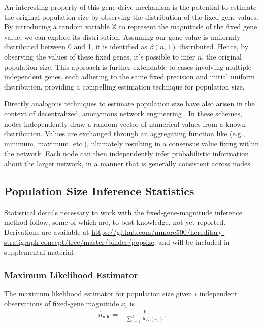 An interesting property of this gene drive mechanism is the potential to estimate the original population size by observing the distribution of the fixed gene values.
By introducing a random variable $\mathbb{X}$ to represent the magnitude of the fixed gene value, we can explore its distribution. Assuming our gene value is uniformly distributed between 0 and 1, it is identified as $\beta(n, 1)$ \citep{gentle2009computational} distributed.
Hence, by observing the values of these fixed genes, it's possible to infer $n$, the original population size.
This approach is further extendable to cases involving multiple independent genes, each adhering to the same fixed precision and initial uniform distribution, providing a compelling estimation technique for population size.

Directly analogous techniques to estimate population size have also arisen in the context of decentralized, anonymous network engineering \citep{varagnolo2010distributed,hakan2012distributed}.
In these schemes, nodes independently draw a random vector of numerical values from a known distribution.
Values are exchanged through an aggregating function like (e.g., minimum, maximum, etc.), ultimately resulting in a consensus value fixing within the network.
Each node can then independently infer probabilistic information about the larger network, in a manner that is generally consistent across nodes.

\subsection{Population Size Inference Statistics}
\label{sec:population-size-inference-stats}

Statistical details necessary to work with the fixed-gene-magnitude inference method follow, some of which are, to best knowledge, not yet reported.
Derivations are available at \url{https://github.com/mmore500/hereditary-stratigraph-concept/tree/master/binder/popsize}, and will be included in supplemental material.

\subsubsection{Maximum Likelihood Estimator}

The maximum likelihood estimator for population size given $i$ independent observations of fixed-gene magnitude $x_i$ is
\begin{align} \label{eqn:popsize_mle}
\hat{n}_\mathrm{mle} = -\frac{k}{\sum_{i=1}^k \log( x_i )}.
\end{align}

